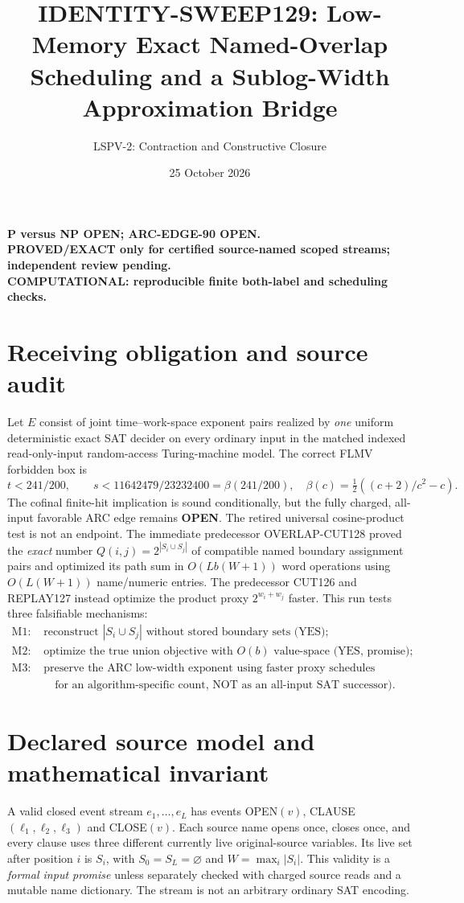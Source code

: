 \documentclass[11pt]{article}
\title{IDENTITY-SWEEP129: Low-Memory Exact Named-Overlap Scheduling and a Sublog-Width Approximation Bridge}
\author{LSPV-2: Contraction and Constructive Closure}
\date{25 October 2026}
\begin{document}
\maketitle
\begin{center}
\textbf{P versus NP OPEN; ARC-EDGE-90 OPEN.}\\
\textbf{PROVED/EXACT only for certified source-named scoped streams; independent review pending.}\\
\textbf{COMPUTATIONAL: reproducible finite both-label and scheduling checks.}
\end{center}

\section{Receiving obligation and source audit}
Let $E$ consist of joint time--work-space exponent pairs realized by \emph{one} uniform deterministic exact SAT decider on every ordinary input in the matched indexed read-only-input random-access Turing-machine model. The correct FLMV forbidden box is
\[
t<241/200,\qquad s<11642479/23232400
=\beta(241/200),\quad
\beta(c)=\tfrac12((c+2)/c^2-c).
\]
The cofinal finite-hit implication is sound conditionally, but the fully charged, all-input favorable ARC edge remains \textbf{OPEN}. The retired universal cosine-product test is not an endpoint.
The immediate predecessor OVERLAP-CUT128 proved the \emph{exact} number
$Q(i,j)=2^{|S_i\cup S_j|}$ of compatible named boundary assignment pairs and optimized its path sum in $O(Lb(W+1))$ word operations using $O(L(W+1))$ name/numeric entries. The predecessor CUT126 and REPLAY127 instead optimize the product proxy $2^{w_i+w_j}$ faster. This run tests three falsifiable mechanisms:
\[
\begin{aligned}
\text{M1: }&\text{reconstruct $|S_i\cup S_j|$ without stored boundary sets (YES);}\\
\text{M2: }&\text{optimize the true union objective with $O(b)$ value-space (YES, promise);}\\
\text{M3: }&\text{preserve the ARC low-width exponent using faster proxy schedules (YES,}\\
&\quad\text{for an algorithm-specific count, NOT as an all-input SAT successor).}
\end{aligned}
\]

\section{Declared source model and mathematical invariant}
A valid closed event stream $e_1,\dots,e_L$ has events OPEN$(v)$, CLAUSE$(\ell_1,\ell_2,\ell_3)$ and CLOSE$(v)$. Each source name opens once, closes once, and every clause uses three different currently live original-source variables. Its live set after position $i$ is $S_i$, with $S_0=S_L=\varnothing$ and $W=\max_i |S_i|$. This validity is a \emph{formal input promise} unless separately checked with charged source reads and a mutable name dictionary. The stream is not an arbitrary ordinary SAT encoding.
\end{document}
